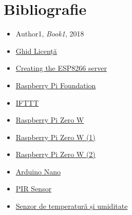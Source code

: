 \chapter*{Bibliografie} 

\begin{itemize}
    \item Author1, \textit{Book1}, 2018
    \item \href{https://profs.info.uaic.ro/~licenta/2019Feb/res/Ghid-LICENTA-2018.pdf}{Ghid Licență}
	\item \href{https://tttapa.github.io/ESP8266/Chap10%20-%20Simple%20Web%20Server.html}{Creating the ESP8266 server}
	\item \href{https://www.raspberrypi.org/}{Raspberry Pi Foundation}
	\item \href{https://www.pcmag.com/reviews/ifttt}{IFTTT}
	\item \href{https://www.pcmag.com/reviews/raspberry-pi-zero-w}{Raspberry Pi Zero W}
	\item \href{https://www.trustedreviews.com/reviews/1-raspberry-pi-zero-w}{Raspberry Pi Zero W (1)}
	\item \href{https://itsfoss.com/raspberry-pi-zero-w/}{Raspberry Pi Zero W (2)}
	\item \href{https://www.makeuseof.com/tag/cheapest-arduino-nano/}{Arduino Nano}
	\item \href{https://www.elektor.com/hc-sr501-pir-motion-sensor-module}{PIR Sensor}
	\item \href{https://www.optimusdigital.ro/ro/senzori-senzori-de-temperatura/1449-modul-senzor-de-temperatura-i-umiditate-dht22.html?search_query=temperatura&results=1060}{Senzor de temperatură și umiditate}
	
\end{itemize}